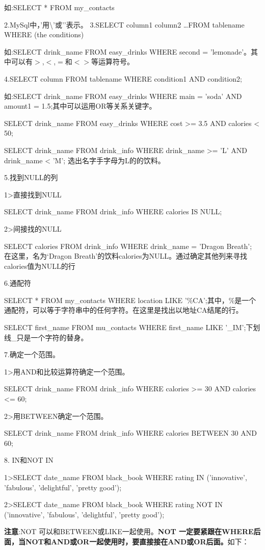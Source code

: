 \documentclass[UTF8]{ctexart}
\begin{document}
如:SELECT * FROM my\_contacts

2.MySql中，'用\textbackslash'或’’表示。
3.SELECT column1 column2 \dots FROM tablename WHERE (the conditions)
	
如:SELECT drink\_name FROM easy\_drinks WHERE second = 'lemonade'。其中可以有$>$,$<$,$=$和$<>$等运算符号。

4.SELECT column FROM tablename WHERE condition1  AND condition2;

如:SELECT drink\_name FROM easy\_drinks WHERE main = 'soda' AND amount1 = 1.5;其中可以运用OR等关系关键字。	
	
SELECT drink\_name FROM easy\_drinks WHERE	cost >= 3.5 AND calories < 50;

SELECT drink\_name FROM drink\_info WHERE drink\_name >= 'L' AND drink\_name < 'M'; 选出名字手字母为L的的饮料。	

5.找到NULL的列

1>直接找到NULL

SELECT drink\_name FROM drink\_info WHERE calories IS NULL;

2>间接找的NULL

SELECT calories FROM drink\_info WHERE drink\_name = 'Dragon Breath'; 在这里，名为‘Dragon Breath’的饮料calories为NULL。通过确定其他列来寻找calories值为NULL的行

6.通配符

SELECT * FROM my\_contacts WHERE location LIKE '$\%$CA';其中，\%是一个通配符，可以等于字符串中的任何字符。在这里是找出以地址CA结尾的行。

SELECT first\_name FROM mu\_contacts WHERE first\_name LIKE '\_IM';下划线\_只是一个字符的替身。

7.确定一个范围。

1>用AND和比较运算符确定一个范围。

SELECT drink\_name FROM drink\_info WHERE calories >= 30 AND calories <= 60;

2>用BETWEEN确定一个范围。

SELECT drink\_name FROM drink\_info WHERE calories BETWEEN 30 AND 60;

8. IN和NOT IN

1>SELECT date\_name FROM black\_book WHERE rating IN ('innovative', 'fabulous', 'delightful', 'pretty good');

2>SELECT date\_name FROM black\_book WHERE rating NOT IN ('innovative', 'fabulous', 'delightful', 'pretty good');

\textbf{注意}:NOT 可以和BETWEEN或LIKE一起使用。\textbf{NOT 一定要紧跟在WHERE后面，当NOT和AND或OR一起使用时，要直接接在AND或OR后面。}如下：
\end{document}
